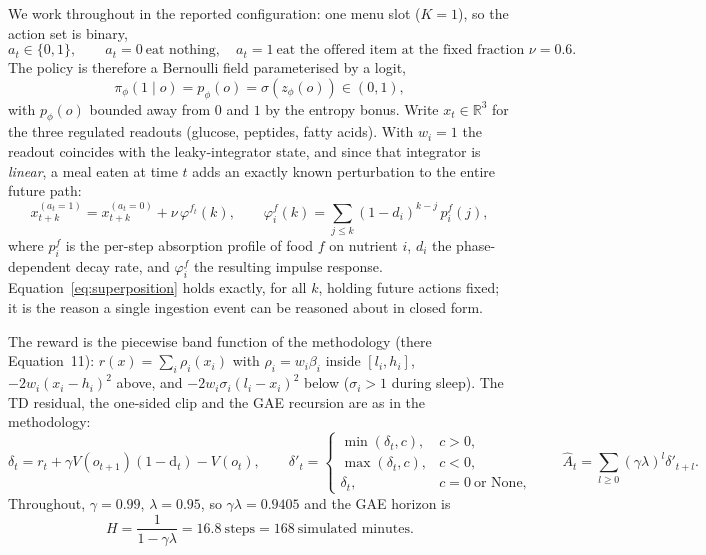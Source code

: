 \documentclass[11pt]{article}
\theoremstyle{definition}
\newcommand{\Ahat}{\hat A}
\begin{document}
We work throughout in the reported configuration: one menu slot ($K=1$), so
the action set is binary,
\begin{equation}
a_t\in\{0,1\},\qquad
a_t=0\ \text{eat nothing},\quad
a_t=1\ \text{eat the offered item at the fixed fraction }\nu=0.6 .
\label{eq:action}
\end{equation}
The policy is therefore a Bernoulli field parameterised by a logit,
\begin{equation}
\pi_\phi(1\mid o)=p_\phi(o)=\sigma\!\left(z_\phi(o)\right)\in(0,1),
\label{eq:policy}
\end{equation}
with $p_\phi(o)$ bounded away from $0$ and $1$ by the entropy bonus. Write
$x_t\in\mathbb{R}^3$ for the three regulated readouts (glucose, peptides,
fatty acids). With $w_i=1$ the readout coincides with the leaky-integrator
state, and since that integrator is \emph{linear}, a meal eaten at time $t$
adds an exactly known perturbation to the entire future path:
\begin{equation}
x^{(a_t=1)}_{t+k}=x^{(a_t=0)}_{t+k}+\nu\,\varphi^{f_t}(k),
\qquad
\varphi^{f}_i(k)=\sum_{j\le k}(1-d_i)^{k-j}\,p^{f}_i(j),
\label{eq:superposition}
\end{equation}
where $p^{f}_i$ is the per-step absorption profile of food $f$ on nutrient
$i$, $d_i$ the phase-dependent decay rate, and $\varphi^f_i$ the resulting
impulse response. Equation~\eqref{eq:superposition} holds exactly, for all
$k$, holding future actions fixed; it is the reason a single ingestion event
can be reasoned about in closed form.

The reward is the piecewise band function of the methodology
(there Equation~11): $r(x)=\sum_i\rho_i(x_i)$ with $\rho_i=w_i\beta_i$ inside
$[l_i,h_i]$, $-2w_i(x_i-h_i)^2$ above, and
$-2w_i\sigma_i(l_i-x_i)^2$ below ($\sigma_i>1$ during sleep). The TD residual,
the one-sided clip and the GAE recursion are as in the methodology:
\begin{equation}
\delta_t=r_t+\gamma V(o_{t+1})(1-\mathrm{d}_t)-V(o_t),
\qquad
\delta'_t=
\begin{cases}
\min(\delta_t,c), & c>0,\\
\max(\delta_t,c), & c<0,\\
\delta_t, & c=0\ \text{or None},
\end{cases}
\qquad
\Ahat_t=\sum_{l\ge0}(\gamma\lambda)^l\delta'_{t+l}.
\label{eq:clip}
\end{equation}
Throughout, $\gamma=0.99$, $\lambda=0.95$, so $\gamma\lambda=0.9405$ and the
GAE horizon is
\begin{equation}
H=\frac{1}{1-\gamma\lambda}=16.8\ \text{steps}=168\ \text{simulated minutes}.
\label{eq:horizon}
\end{equation}
\end{document}
